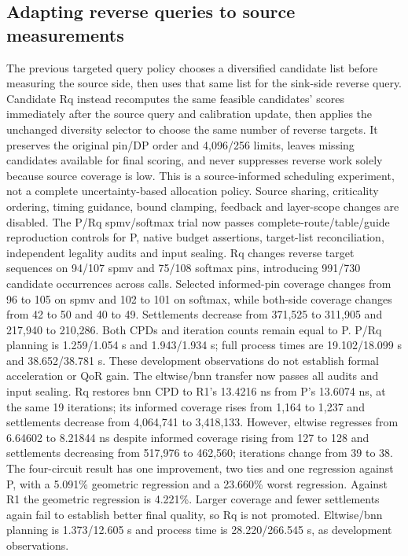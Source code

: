 \documentclass[conference,10pt]{IEEEtran}
\begin{document}
\subsection{Adapting reverse queries to source measurements}
The previous targeted query policy chooses a diversified candidate list before measuring the source side, then uses that same list for the sink-side reverse query. Candidate Rq instead recomputes the same feasible candidates' scores immediately after the source query and calibration update, then applies the unchanged diversity selector to choose the same number of reverse targets. It preserves the original pin/DP order and 4,096/256 limits, leaves missing candidates available for final scoring, and never suppresses reverse work solely because source coverage is low. This is a source-informed scheduling experiment, not a complete uncertainty-based allocation policy. Source sharing, criticality ordering, timing guidance, bound clamping, feedback and layer-scope changes are disabled. The P/Rq spmv/softmax trial now passes complete-route/table/guide reproduction controls for P, native budget assertions, target-list reconciliation, independent legality audits and input sealing. Rq changes reverse target sequences on 94/107 spmv and 75/108 softmax pins, introducing 991/730 candidate occurrences across calls. Selected informed-pin coverage changes from 96 to 105 on spmv and 102 to 101 on softmax, while both-side coverage changes from 42 to 50 and 40 to 49. Settlements decrease from 371,525 to 311,905 and 217,940 to 210,286. Both CPDs and iteration counts remain equal to P. P/Rq planning is 1.259/1.054 s and 1.943/1.934 s; full process times are 19.102/18.099 s and 38.652/38.781 s. These development observations do not establish formal acceleration or QoR gain. The eltwise/bnn transfer now passes all audits and input sealing. Rq restores bnn CPD to R1's 13.4216 ns from P's 13.6074 ns, at the same 19 iterations; its informed coverage rises from 1,164 to 1,237 and settlements decrease from 4,064,741 to 3,418,133. However, eltwise regresses from 6.64602 to 8.21844 ns despite informed coverage rising from 127 to 128 and settlements decreasing from 517,976 to 462,560; iterations change from 39 to 38. The four-circuit result has one improvement, two ties and one regression against P, with a 5.091\% geometric regression and a 23.660\% worst regression. Against R1 the geometric regression is 4.221\%. Larger coverage and fewer settlements again fail to establish better final quality, so Rq is not promoted. Eltwise/bnn planning is 1.373/12.605 s and process time is 28.220/266.545 s, as development observations.
\end{document}
